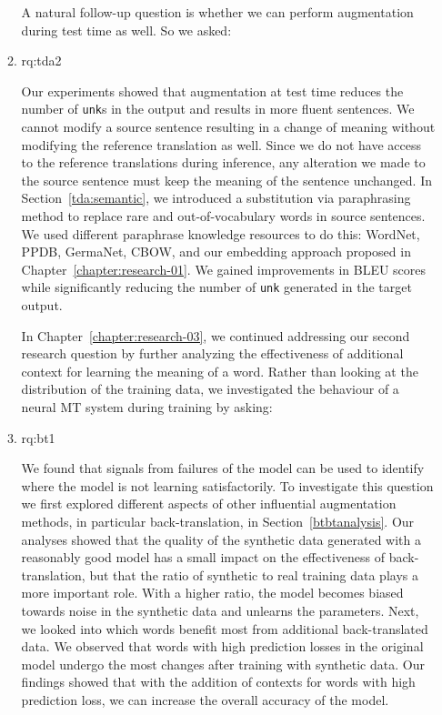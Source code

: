 \begin{enumerate}[label=\textbf{Research Question \arabic*:},ref={RQ\arabic*},wide = 0pt]
\begin{enumerate}[label=\textbf{RQ2.\arabic* },wide = 0pt, leftmargin=2em]
\medskip

A natural follow-up question is whether we can perform augmentation during test time as well. So we asked:


\item \acl{rq:tda2} \label{rq:tda2}

\medskip

\noindent 
Our experiments showed that augmentation at test time reduces the number of \texttt{unk}s in the output and results in more fluent sentences. 
We cannot modify a source sentence resulting in a change of meaning without modifying the reference translation as well. 
Since we do not have access to the reference translations during inference, any alteration we made to the source sentence must keep the meaning of the sentence unchanged. 
In Section~\ref{tda:semantic}, we introduced a substitution via paraphrasing method to replace rare and out-of-vocabulary words in source sentences. We used different paraphrase knowledge resources to do this: WordNet, PPDB, GermaNet, CBOW, and our embedding approach proposed in Chapter~\ref{chapter:research-01}.
We gained improvements in BLEU scores while significantly reducing the number of \texttt{unk} generated in the target output. 

\medskip

In Chapter~\ref{chapter:research-03}, we continued addressing our second research question by further analyzing the effectiveness of additional context for learning the meaning of a word.
Rather than looking at the distribution of the training data, we investigated the behaviour of a neural MT system during training by asking:


\item \acl{rq:bt1} \label{rq:bt1}

\medskip

\noindent 
We found that signals from failures of the model can be used to identify where the model is not learning satisfactorily.
To investigate this question we first explored different aspects of other influential augmentation methods, in particular back-translation, in Section~\ref{btbtanalysis}. 
Our analyses showed that the quality of the synthetic data generated with a reasonably good model has a small impact on the effectiveness of back-translation, but that the ratio of synthetic to real training data plays a more important role.
With a higher ratio, the model becomes biased towards noise in the synthetic data and unlearns the parameters.
Next, we looked into which words benefit most from additional back-translated data.
We observed that words with high prediction losses in the original model undergo the most changes after training with synthetic data. 
Our findings showed that with the addition of contexts for words with high prediction loss, we can increase the overall accuracy of the model.


\end{enumerate}
\end{enumerate}
